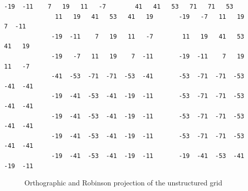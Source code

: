 \begin{lstlisting}[frame=single, backgroundcolor=\color{pyellow}, basicstyle=\footnotesize]
             -19  -11    7   19   11   -7        41   41   53   71   71   53
              11   19   41   53   41   19       -19   -7   11   19    7  -11
             -19  -11    7   19   11   -7        11   19   41   53   41   19
             -19   -7   11   19    7  -11       -19  -11    7   19   11   -7
             -41  -53  -71  -71  -53  -41       -53  -71  -71  -53  -41  -41
             -19  -41  -53  -41  -19  -11       -53  -71  -71  -53  -41  -41
             -19  -41  -53  -41  -19  -11       -53  -71  -71  -53  -41  -41
             -19  -41  -53  -41  -19  -11       -53  -71  -71  -53  -41  -41
             -19  -41  -53  -41  -19  -11       -19  -41  -53  -41  -19  -11
\end{lstlisting}

\begin{figure}[b]

\caption[cellgrid]{Orthographic and Robinson projection of the unstructured grid}
\end{figure}

